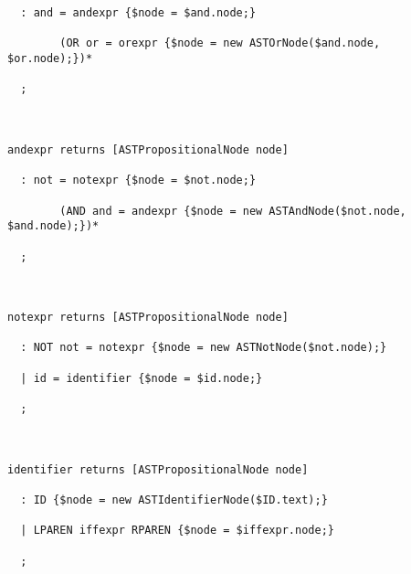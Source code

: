 \documentclass[12pt]{article}
\begin{document}
\begin{verbatim}
  : and = andexpr {$node = $and.node;} 

		(OR or = orexpr {$node = new ASTOrNode($and.node, $or.node);})*

  ;



andexpr returns [ASTPropositionalNode node]

  : not = notexpr {$node = $not.node;} 

		(AND and = andexpr {$node = new ASTAndNode($not.node, $and.node);})*

  ;

  

notexpr returns [ASTPropositionalNode node]

  : NOT not = notexpr {$node = new ASTNotNode($not.node);}

  | id = identifier {$node = $id.node;}

  ;



identifier returns [ASTPropositionalNode node]

  : ID {$node = new ASTIdentifierNode($ID.text);}

  | LPAREN iffexpr RPAREN {$node = $iffexpr.node;}

  ;

\end{verbatim}
\end{document}
